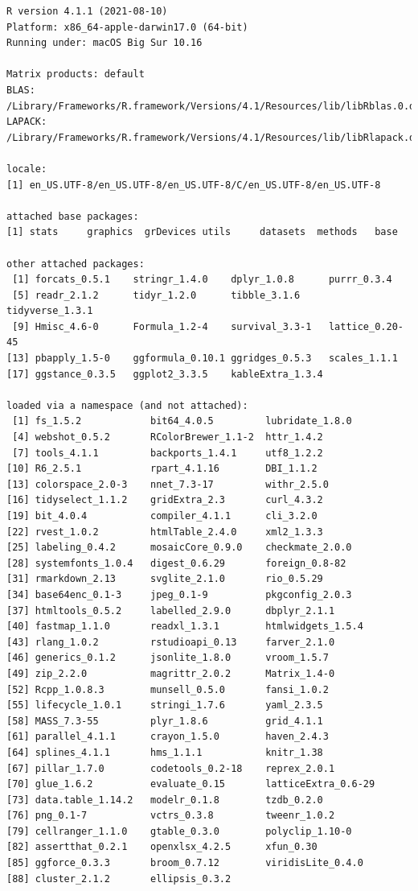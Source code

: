 \documentclass[
  letterpaper,
  DIV=11,
  numbers=noendperiod]{scrreprt}
\begin{document}
\begin{verbatim}
R version 4.1.1 (2021-08-10)
Platform: x86_64-apple-darwin17.0 (64-bit)
Running under: macOS Big Sur 10.16

Matrix products: default
BLAS:   /Library/Frameworks/R.framework/Versions/4.1/Resources/lib/libRblas.0.dylib
LAPACK: /Library/Frameworks/R.framework/Versions/4.1/Resources/lib/libRlapack.dylib

locale:
[1] en_US.UTF-8/en_US.UTF-8/en_US.UTF-8/C/en_US.UTF-8/en_US.UTF-8

attached base packages:
[1] stats     graphics  grDevices utils     datasets  methods   base     

other attached packages:
 [1] forcats_0.5.1    stringr_1.4.0    dplyr_1.0.8      purrr_0.3.4     
 [5] readr_2.1.2      tidyr_1.2.0      tibble_3.1.6     tidyverse_1.3.1 
 [9] Hmisc_4.6-0      Formula_1.2-4    survival_3.3-1   lattice_0.20-45 
[13] pbapply_1.5-0    ggformula_0.10.1 ggridges_0.5.3   scales_1.1.1    
[17] ggstance_0.3.5   ggplot2_3.3.5    kableExtra_1.3.4

loaded via a namespace (and not attached):
 [1] fs_1.5.2            bit64_4.0.5         lubridate_1.8.0    
 [4] webshot_0.5.2       RColorBrewer_1.1-2  httr_1.4.2         
 [7] tools_4.1.1         backports_1.4.1     utf8_1.2.2         
[10] R6_2.5.1            rpart_4.1.16        DBI_1.1.2          
[13] colorspace_2.0-3    nnet_7.3-17         withr_2.5.0        
[16] tidyselect_1.1.2    gridExtra_2.3       curl_4.3.2         
[19] bit_4.0.4           compiler_4.1.1      cli_3.2.0          
[22] rvest_1.0.2         htmlTable_2.4.0     xml2_1.3.3         
[25] labeling_0.4.2      mosaicCore_0.9.0    checkmate_2.0.0    
[28] systemfonts_1.0.4   digest_0.6.29       foreign_0.8-82     
[31] rmarkdown_2.13      svglite_2.1.0       rio_0.5.29         
[34] base64enc_0.1-3     jpeg_0.1-9          pkgconfig_2.0.3    
[37] htmltools_0.5.2     labelled_2.9.0      dbplyr_2.1.1       
[40] fastmap_1.1.0       readxl_1.3.1        htmlwidgets_1.5.4  
[43] rlang_1.0.2         rstudioapi_0.13     farver_2.1.0       
[46] generics_0.1.2      jsonlite_1.8.0      vroom_1.5.7        
[49] zip_2.2.0           magrittr_2.0.2      Matrix_1.4-0       
[52] Rcpp_1.0.8.3        munsell_0.5.0       fansi_1.0.2        
[55] lifecycle_1.0.1     stringi_1.7.6       yaml_2.3.5         
[58] MASS_7.3-55         plyr_1.8.6          grid_4.1.1         
[61] parallel_4.1.1      crayon_1.5.0        haven_2.4.3        
[64] splines_4.1.1       hms_1.1.1           knitr_1.38         
[67] pillar_1.7.0        codetools_0.2-18    reprex_2.0.1       
[70] glue_1.6.2          evaluate_0.15       latticeExtra_0.6-29
[73] data.table_1.14.2   modelr_0.1.8        tzdb_0.2.0         
[76] png_0.1-7           vctrs_0.3.8         tweenr_1.0.2       
[79] cellranger_1.1.0    gtable_0.3.0        polyclip_1.10-0    
[82] assertthat_0.2.1    openxlsx_4.2.5      xfun_0.30          
[85] ggforce_0.3.3       broom_0.7.12        viridisLite_0.4.0  
[88] cluster_2.1.2       ellipsis_0.3.2     
\end{verbatim}
\end{document}
